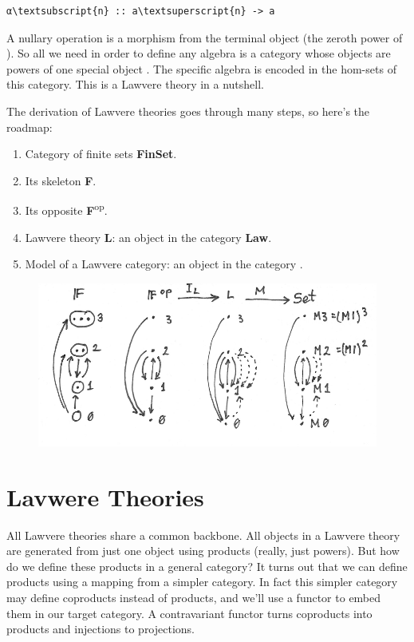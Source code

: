 \begin{Verbatim}[commandchars=\\\{\}]
α\textsubscript{n} :: a\textsuperscript{n} -> a
\end{Verbatim}
A nullary operation is a morphism from the terminal object (the zeroth
power of ). So all we need in order to define any algebra is a
category whose objects are powers of one special object . The
specific algebra is encoded in the hom-sets of this category. This is a
Lawvere theory in a nutshell.

The derivation of Lawvere theories goes through many steps, so here's
the roadmap:

\begin{enumerate}
\tightlist
\item
  Category of finite sets \textbf{FinSet}.
\item
  Its skeleton \textbf{F}.
\item
  Its opposite \textbf{F}\textsuperscript{op}.
\item
  Lawvere theory \textbf{L}: an object in the category \textbf{Law}.
\item
  Model  of a Lawvere category: an object in the category
  .
\end{enumerate}

\begin{figure}[H]
\centering
\includegraphics[width=\textwidth]{images/lawvere1.png}
\end{figure}

\section{Lavwere Theories}\label{lavwere-theories}

All Lawvere theories share a common backbone. All objects in a Lawvere
theory are generated from just one object using products (really, just
powers). But how do we define these products in a general category? It
turns out that we can define products using a mapping from a simpler
category. In fact this simpler category may define coproducts instead of
products, and we'll use a  functor to embed them in
our target category. A contravariant functor turns coproducts into
products and injections to projections.

